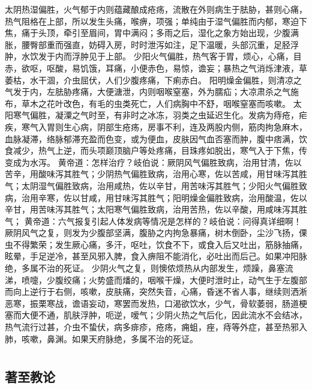 \documentclass[a4paper,12pt,UTF8,twoside]{ctexbook}
\begin{document}
太阴热湿偏胜，火气郁于内则蕴藏酿成疮疡，流散在外则病生于胠胁，甚则心痛，热气阻格在上部，所以发生头痛，喉痹，项强；单纯由于湿气偏胜而内郁，寒迫下焦，痛于头顶，牵引至眉间，胃中满闷；多雨之后，湿化之象方始出现，少腹满胀，腰臀部重而强直，妨碍入房，时时泄泻如注，足下温暖，头部沉重，足胫浮肿，水饮发于内而浮肿见于上部。
少阳火气偏胜，热气客于胃，烦心，心痛，目赤，欲呕，呕酸，易饥饿，耳痛，小便赤色，易惊，谵妄；暴热之气消烁津液，草萎枯，水干涸，介虫屈伏，人们少腹疼痛，下痢赤白。
阳明燥金偏胜，则清凉之气发于内，左胠胁疼痛，大便溏泄，内则咽喉窒塞，外为臑疝；大凉肃杀之气施布，草木之花叶改色，有毛的虫类死亡，人们病胸中不舒，咽喉窒塞而咳嗽。
太阳寒气偏胜，凝潥之气时至，有非时之冰冻，羽类之虫延迟生化。发病为痔疮，疟疾，寒气入胃则生心病，阴部生疮疡，房事不利，连及两股内侧，筋肉拘急麻木，血脉凝滞，络脉郁滞充盈而色变，或为便血，皮肤因气血否塞而肿，腹中痞满，饮食减少，热气上逆，而头项巅顶脑户等处疼痛，目珠疼如脱出，寒气入于下焦，传变成为水泻。
黄帝道：怎样治疗？岐伯说：厥阴风气偏胜致病，治用甘清，佐以苦辛，用酸味泻其胜气；少阴热气偏胜致病，治用心寒，佐以苦咸，用甘味泻其胜气；太阴湿气偏胜致病，治用咸热，佐以辛甘，用苦味泻其胜气；少阳火气偏胜致病，治用辛寒，佐以甘咸，用甘味泻其胜气；阳明燥金偏胜致病，治用酸温，佐以辛甘，用苦味泻其胜气；太阳寒气偏胜致病，治用苦热，佐以辛酸，用咸味泻其胜气；
黄帝道：六气报复引起人体发病等情况是怎样的？岐伯说：问得真详细啊！厥阴风气之复，则发为少腹部坚满，腹胁之内拘急暴痛，树木倒卧，尘沙飞扬，倮虫不得繁荣；发生厥心痛，多汗，呕吐，饮食不下，或食入后又吐出，筋脉抽痛，眩晕，手足逆冷，甚至风邪入脾，食入痹阻不能消化，必吐出而后己。如果冲阳脉绝，多属不治的死证。
少阴火气之复，则懊侬烦热从内部发生，烦躁，鼻塞流涕，喷嚏，少腹绞痛；火势盛而燔的，咽喉干燥，大便时泄时止，动气生于左腹部而向上逆行于右侧，咳嗽，皮肤痛，突然失音，心痛，昏迷不省人事，继续则洒淅恶寒，振栗寒战，谵语妄动，寒罢而发热，口渴欲饮水，少气，骨软萎弱，肠道梗塞而大便不通，肌肤浮肿，呃逆，嗳气；少阴火热之气后化，因此流水不会结冰，热气流行过甚，介虫不蛰伏，病多痱疹，疮疡，痈蛆，痤，痔等外症，甚至热邪入肺，咳嗽，鼻渊。如果天府脉绝，多属不治的死证。

\part{}

\chapter{著至教论}
\end{document}
